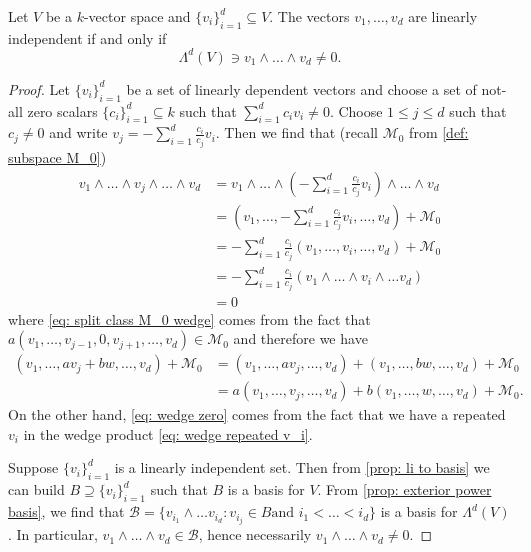 \begin{proposition}\label{prop: li iff wedge nonzero}
  Let \(V\) be a \(k\)-vector space and \(\{v_i\}_{i=1}^d \subseteq V\). The
  vectors \(v_1, \dots, v_d\) are linearly independent if and only if
  \[
    \Lambda^d(V) \ni v_1 \wedge \dots \wedge v_d \neq 0.
  \]
\end{proposition}

\begin{proof}
  Let \(\{v_i\}_{i=1}^d\) be a set of linearly dependent vectors and choose
  a set of not-all zero scalars \(\{c_i\}_{i=1}^d \subseteq k\) such that
  \(\sum_{i=1}^d c_i v_i \neq 0\). Choose \(1 \leq j \leq d\) such that \(c_j
  \neq 0\) and write \(v_j = -\sum_{i=1}^d \frac{c_i}{c_j} v_i\). Then we find
  that (recall \(\mathcal M_0\) from \cref{def: subspace M_0})
  \begin{align}
    \nonumber
    v_1 \wedge \dots \wedge v_j \wedge \dots \wedge v_d
    &= v_1 \wedge \dots \wedge \left( - \sum_{i=1}^d \frac{c_i}{c_j} v_i \right)
    \wedge \dots \wedge v_d
    \\
    \nonumber
    &= \left( v_1, \dots, - \sum_{i=1}^d \frac{c_i}{c_j} v_i, \dots, v_d \right)
    + \mathcal M_0 \\
    \label{eq: split class M_0 wedge}
    &= -\sum_{i=1}^d \frac{c_i}{c_j} (v_1, \dots, v_i, \dots, v_d) + \mathcal
    M_0
    \\
    \label{eq: wedge repeated v_i}
    &= - \sum_{i=1}^d \frac{c_i}{c_j} (v_1 \wedge \dots \wedge v_i \wedge \dots
    v_d)
    \\
    \label{eq: wedge zero}
    &= 0
  \end{align}
  where \cref{eq: split class M_0 wedge} comes from the fact that \(a(v_1, \dots,
  v_{j-1}, 0, v_{j+1}, \dots, v_d) \in \mathcal M_0\) and therefore we have
  \begin{align*}
    (v_1, \dots, a v_j + b w, \dots, v_d) + \mathcal M_0
    &= (v_1, \dots, a v_j, \dots, v_d) + (v_1, \dots, b w, \dots, v_d)
    + \mathcal M_0 \\
    &= a(v_1, \dots, v_j, \dots, v_d) + b(v_1, \dots, w, \dots, v_d)
    + \mathcal M_0.
  \end{align*}
  On the other hand, \cref{eq: wedge zero} comes from the fact that we have a
  repeated \(v_i\) in the wedge product \cref{eq: wedge repeated v_i}.

  Suppose \(\{v_i\}_{i=1}^d\) is a linearly independent set. Then from
  \cref{prop: li to basis} we can build \(B \supseteq \{v_i\}_{i=1}^d\) such
  that \(B\) is a basis for \(V\). From \cref{prop: exterior power basis}, we
  find that \(\mathcal B = \{v_{i_1} \wedge \dots v_{i_d} : v_{i_j} \in B \text{
  and } i_1 < \dots < i_d\}\) is a basis for \(\Lambda^d(V)\). In particular,
  \(v_1 \wedge \dots \wedge v_d \in \mathcal B\), hence necessarily \(v_1 \wedge
  \dots \wedge v_d \neq 0\).
\end{proof}

